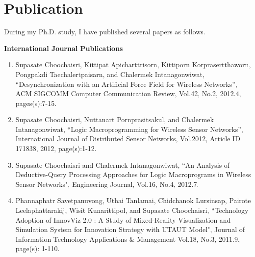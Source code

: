 \chapter{Publication} 
\label{app:math}

During my Ph.D. study, I have published several papers as follows.

{\flushleft\bfseries International Journal Publications}
\begin{enumerate}
\item Supasate Choochaisri, Kittipat Apicharttrisorn, Kittiporn Korprasertthaworn, Pongpakdi Taechalertpaisarn, and Chalermek Intanagonwiwat, ``Desynchronization with an Artificial Force Field for Wireless Networks'', ACM SIGCOMM Computer Communication Review, Vol.42, No.2, 2012.4, pages(s):7-15.
\item Supasate Choochaisri, Nuttanart Pornprasitsakul, and Chalermek Intanagonwiwat, ``Logic Macroprogramming for Wireless Sensor Networks'', International Journal of Distributed Sensor Networks, Vol.2012, Article ID 171838, 2012, page(s):1-12.
\item Supasate Choochaisri and Chalermek Intanagonwiwat, ``An Analysis of Deductive-Query Processing Approaches for Logic Macroprograms in Wireless Sensor Networks", Engineering Journal, Vol.16, No.4, 2012.7.
\item Phannaphatr Savetpanuvong, Uthai Tanlamai, Chidchanok Lursinsap, Pairote Leelaphattarakij, Wisit Kunarittipol, and Supasate Choochaisri, ``Technology Adoption of InnovViz 2.0 : A Study of Mixed-Reality Visualization and Simulation System for Innovation Strategy with UTAUT Model", Journal of Information Technology Applications \& Management Vol.18, No.3, 2011.9, page(s): 1-110.
\end{enumerate}

